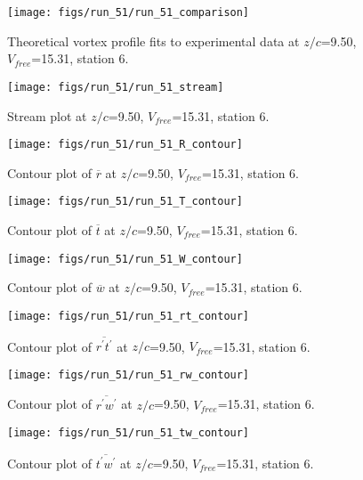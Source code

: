 \begin{figure}[H]
\centering
\texttt{[image: figs/run\_51/run\_51\_comparison]}
\caption{Theoretical vortex profile fits to experimental data at $z/c$=9.50, $V_{free}$=15.31, station 6.}
\label{fig:run_51_comparison}
\end{figure}


\begin{figure}[H]
\centering
\texttt{[image: figs/run\_51/run\_51\_stream]}
\caption{Stream plot at $z/c$=9.50, $V_{free}$=15.31, station 6.}
\label{fig:run_51_stream}
\end{figure}


\begin{figure}[H]
\centering
\texttt{[image: figs/run\_51/run\_51\_R\_contour]}
\caption{Contour plot of $\overline{r}$ at $z/c$=9.50, $V_{free}$=15.31, station 6.}
\label{fig:run_51_R_contour}
\end{figure}


\begin{figure}[H]
\centering
\texttt{[image: figs/run\_51/run\_51\_T\_contour]}
\caption{Contour plot of $\overline{t}$ at $z/c$=9.50, $V_{free}$=15.31, station 6.}
\label{fig:run_51_T_contour}
\end{figure}


\begin{figure}[H]
\centering
\texttt{[image: figs/run\_51/run\_51\_W\_contour]}
\caption{Contour plot of $\overline{w}$ at $z/c$=9.50, $V_{free}$=15.31, station 6.}
\label{fig:run_51_W_contour}
\end{figure}


\begin{figure}[H]
\centering
\texttt{[image: figs/run\_51/run\_51\_rt\_contour]}
\caption{Contour plot of $\overline{r^\prime t^\prime}$ at $z/c$=9.50, $V_{free}$=15.31, station 6.}
\label{fig:run_51_rt_contour}
\end{figure}


\begin{figure}[H]
\centering
\texttt{[image: figs/run\_51/run\_51\_rw\_contour]}
\caption{Contour plot of $\overline{r^\prime w^\prime}$ at $z/c$=9.50, $V_{free}$=15.31, station 6.}
\label{fig:run_51_rw_contour}
\end{figure}


\begin{figure}[H]
\centering
\texttt{[image: figs/run\_51/run\_51\_tw\_contour]}
\caption{Contour plot of $\overline{t^\prime w^\prime}$ at $z/c$=9.50, $V_{free}$=15.31, station 6.}
\label{fig:run_51_tw_contour}
\end{figure}


